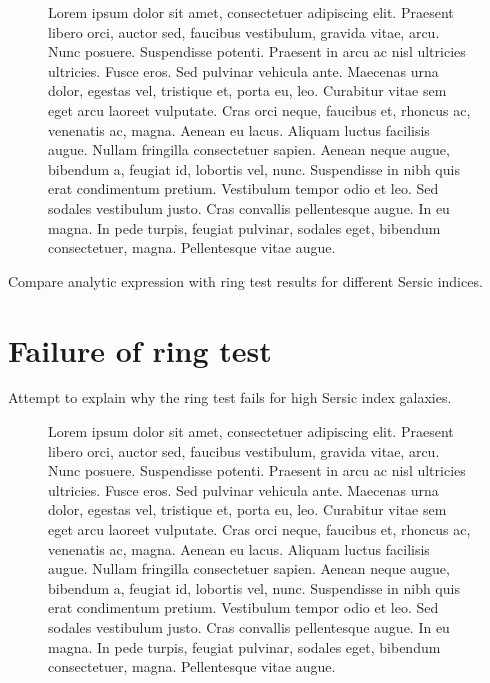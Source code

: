 \documentclass[apj]{emulateapj}
\begin{document}
\begin{figure}
\begin{center}
\end{center}
\caption[fig2]{\label{fig:two} Lorem ipsum dolor sit amet,
  consectetuer adipiscing elit. Praesent libero orci, auctor sed,
  faucibus vestibulum, gravida vitae, arcu. Nunc posuere. Suspendisse
  potenti. Praesent in arcu ac nisl ultricies ultricies. Fusce
  eros. Sed pulvinar vehicula ante. Maecenas urna dolor, egestas vel,
  tristique et, porta eu, leo. Curabitur vitae sem eget arcu laoreet
  vulputate. Cras orci neque, faucibus et, rhoncus ac, venenatis ac,
  magna. Aenean eu lacus. Aliquam luctus facilisis augue. Nullam
  fringilla consectetuer sapien. Aenean neque augue, bibendum a,
  feugiat id, lobortis vel, nunc. Suspendisse in nibh quis erat
  condimentum pretium. Vestibulum tempor odio et leo. Sed sodales
  vestibulum justo. Cras convallis pellentesque augue. In eu magna. In
  pede turpis, feugiat pulvinar, sodales eget, bibendum consectetuer,
  magna. Pellentesque vitae augue.}
\end{figure}

Compare analytic expression with ring test results for different Sersic indices.

\section{Failure of ring test}\label{sec:failure}
Attempt to explain why the ring test fails for high Sersic index galaxies.

\begin{figure*}
\begin{center}
\end{center}
\caption[fig1]{\label{fig:one} Lorem ipsum dolor sit amet,
  consectetuer adipiscing elit. Praesent libero orci, auctor sed,
  faucibus vestibulum, gravida vitae, arcu. Nunc posuere. Suspendisse
  potenti. Praesent in arcu ac nisl ultricies ultricies. Fusce
  eros. Sed pulvinar vehicula ante. Maecenas urna dolor, egestas vel,
  tristique et, porta eu, leo. Curabitur vitae sem eget arcu laoreet
  vulputate. Cras orci neque, faucibus et, rhoncus ac, venenatis ac,
  magna. Aenean eu lacus. Aliquam luctus facilisis augue. Nullam
  fringilla consectetuer sapien. Aenean neque augue, bibendum a,
  feugiat id, lobortis vel, nunc. Suspendisse in nibh quis erat
  condimentum pretium. Vestibulum tempor odio et leo. Sed sodales
  vestibulum justo. Cras convallis pellentesque augue. In eu magna. In
  pede turpis, feugiat pulvinar, sodales eget, bibendum consectetuer,
  magna. Pellentesque vitae augue.}
\end{figure*}
\end{document}

